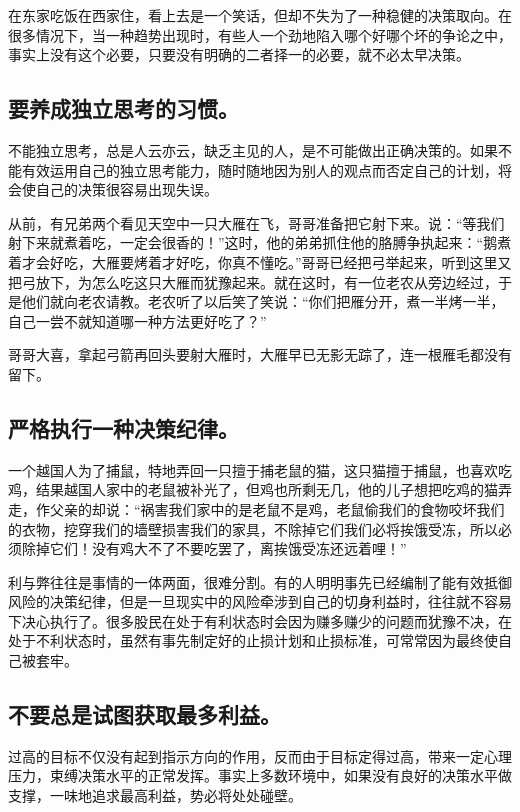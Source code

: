 \documentclass[11pt]{ctexart}
\begin{document}
在东家吃饭在西家住，看上去是一个笑话，但却不失为了一种稳健的决策取向。在很多情况下，当一种趋势出现时，有些人一个劲地陷入哪个好哪个坏的争论之中，事实上没有这个必要，只要没有明确的二者择一的必要，就不必太早决策。
\subsection{要养成独立思考的习惯。}
\label{sec-16-2}


不能独立思考，总是人云亦云，缺乏主见的人，是不可能做出正确决策的。如果不能有效运用自己的独立思考能力，随时随地因为别人的观点而否定自己的计划，将会使自己的决策很容易出现失误。

从前，有兄弟两个看见天空中一只大雁在飞，哥哥准备把它射下来。说：“等我们射下来就煮着吃，一定会很香的！”这时，他的弟弟抓住他的胳膊争执起来：“鹅煮着才会好吃，大雁要烤着才好吃，你真不懂吃。”哥哥已经把弓举起来，听到这里又把弓放下，为怎么吃这只大雁而犹豫起来。就在这时，有一位老农从旁边经过，于是他们就向老农请教。老农听了以后笑了笑说：“你们把雁分开，煮一半烤一半，自己一尝不就知道哪一种方法更好吃了？”

哥哥大喜，拿起弓箭再回头要射大雁时，大雁早已无影无踪了，连一根雁毛都没有留下。
\subsection{严格执行一种决策纪律。}
\label{sec-16-3}


一个越国人为了捕鼠，特地弄回一只擅于捕老鼠的猫，这只猫擅于捕鼠，也喜欢吃鸡，结果越国人家中的老鼠被补光了，但鸡也所剩无几，他的儿子想把吃鸡的猫弄走，作父亲的却说：“祸害我们家中的是老鼠不是鸡，老鼠偷我们的食物咬坏我们的衣物，挖穿我们的墙壁损害我们的家具，不除掉它们我们必将挨饿受冻，所以必须除掉它们！没有鸡大不了不要吃罢了，离挨饿受冻还远着哩！”

利与弊往往是事情的一体两面，很难分割。有的人明明事先已经编制了能有效抵御风险的决策纪律，但是一旦现实中的风险牵涉到自己的切身利益时，往往就不容易下决心执行了。很多股民在处于有利状态时会因为赚多赚少的问题而犹豫不决，在处于不利状态时，虽然有事先制定好的止损计划和止损标准，可常常因为最终使自己被套牢。
\subsection{不要总是试图获取最多利益。}
\label{sec-16-4}


过高的目标不仅没有起到指示方向的作用，反而由于目标定得过高，带来一定心理压力，束缚决策水平的正常发挥。事实上多数环境中，如果没有良好的决策水平做支撑，一味地追求最高利益，势必将处处碰壁。
\end{document}
